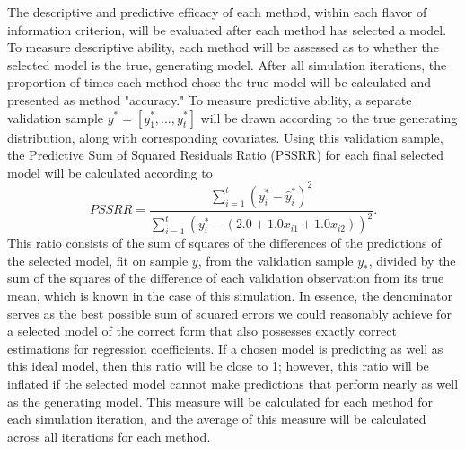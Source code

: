 		The descriptive and predictive efficacy of each method, within each flavor of information criterion, will be evaluated after each method has selected a model.
		To measure descriptive ability, each method will be assessed as to whether the selected model is the true, generating model. After all simulation iterations,
		the proportion of times each method chose the true model will be calculated and presented as method "accuracy." To measure predictive ability, a separate
		validation sample $y^* = [y^*_1,...,y^*_t]$ will be drawn according to the true generating distribution, along with corresponding covariates. Using this
		validation sample, the Predictive Sum of Squared Residuals Ratio (PSSRR) for each final selected model will be calculated according to
		\begin{equation*}
			PSSRR = \frac{\sum_{i=1}^{t} (y^*_i - \hat{y}^*_i)^2}{\sum_{i=1}^{t} (y^*_i - (2.0 + 1.0x_{i1} + 1.0x_{i2}))^2} .
		\end{equation*}
		This ratio consists of the sum of squares of the differences of the predictions of the selected model, fit on sample $y$, from the validation sample $y_*$,
		divided by the sum of the squares of the difference of each validation observation from its true mean, which is known in the case of this simulation. In essence,
		the denominator serves as the best possible sum of squared errors we could reasonably achieve for a selected model of the correct form that also possesses exactly correct estimations for regression
		coefficients. If a chosen model is predicting as well as this ideal model, then this ratio will be close to 1; however, this ratio will be inflated if the selected model
		cannot make predictions that perform nearly as well as the generating model. This measure will be calculated for each method for each simulation iteration, and the average of this measure will be calculated
		across all iterations for each method.

